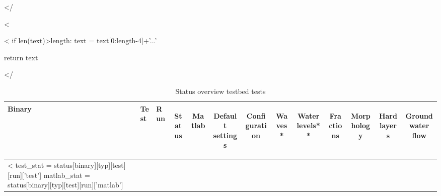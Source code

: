 </%

<%

<%
    if len(text)>length:
        text = text[0:length-4]+'...'
        
    return text

</%

\begin{center}
    \begin{longtable}{lllcccccccccc}
        \caption{Status overview testbed tests}
        \label{tab:overview}
        \hline
            Binary &
            Test &
            Run &
            \begin{sideways}Status\end{sideways} &
            \begin{sideways}Matlab\end{sideways} &
            \begin{sideways}Default settings\end{sideways} &
            \begin{sideways}Configuration\end{sideways} &
            \begin{sideways}Waves*\end{sideways} &
            \begin{sideways}Water levels**\end{sideways} &
            \begin{sideways}Fractions\end{sideways} &
            \begin{sideways}Morphology\end{sideways} &
            \begin{sideways}Hard layers\end{sideways} &
            \begin{sideways}Groundwater flow\end{sideways} \\ 
        \hline
        \endhead
        




<%
        test_stat = status[binary][typ][test][run]['test']
        matlab_stat = status[binary][typ][test][run]['matlab']


\end{longtable}
\end{center}
